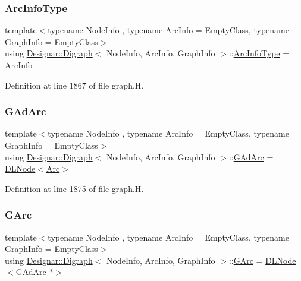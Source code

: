 \subsubsection{\texorpdfstring{Arc\+Info\+Type}{ArcInfoType}}
{\footnotesize\ttfamily template$<$typename Node\+Info , typename Arc\+Info  = Empty\+Class, typename Graph\+Info  = Empty\+Class$>$ \\
using \hyperlink{class_designar_1_1_digraph}{Designar\+::\+Digraph}$<$ Node\+Info, Arc\+Info, Graph\+Info $>$\+::\hyperlink{class_designar_1_1_digraph_a84a736f6c32da0fcbd1d047e74264d00}{Arc\+Info\+Type} =  Arc\+Info}



Definition at line 1867 of file graph.\+H.

\mbox{\label{class_designar_1_1_digraph_a0c6d846f23d1e82556fb6055557df53f}} 
\subsubsection{\texorpdfstring{G\+Ad\+Arc}{GAdArc}}
{\footnotesize\ttfamily template$<$typename Node\+Info , typename Arc\+Info  = Empty\+Class, typename Graph\+Info  = Empty\+Class$>$ \\
using \hyperlink{class_designar_1_1_digraph}{Designar\+::\+Digraph}$<$ Node\+Info, Arc\+Info, Graph\+Info $>$\+::\hyperlink{class_designar_1_1_digraph_a0c6d846f23d1e82556fb6055557df53f}{G\+Ad\+Arc} =  \hyperlink{class_designar_1_1_d_l_node}{D\+L\+Node}$<$\hyperlink{class_designar_1_1_digraph_a0ceb278671f2a535c00fddccdeafd69f}{Arc}$>$\hspace{0.3cm}{\ttfamily [protected]}}



Definition at line 1875 of file graph.\+H.

\mbox{\label{class_designar_1_1_digraph_a341acf8fb0195a8986158c29c4db1a89}} 
\subsubsection{\texorpdfstring{G\+Arc}{GArc}}
{\footnotesize\ttfamily template$<$typename Node\+Info , typename Arc\+Info  = Empty\+Class, typename Graph\+Info  = Empty\+Class$>$ \\
using \hyperlink{class_designar_1_1_digraph}{Designar\+::\+Digraph}$<$ Node\+Info, Arc\+Info, Graph\+Info $>$\+::\hyperlink{class_designar_1_1_digraph_a341acf8fb0195a8986158c29c4db1a89}{G\+Arc} =  \hyperlink{class_designar_1_1_d_l_node}{D\+L\+Node}$<$\hyperlink{class_designar_1_1_digraph_a0c6d846f23d1e82556fb6055557df53f}{G\+Ad\+Arc} $\ast$$>$\hspace{0.3cm}{\ttfamily [protected]}}



